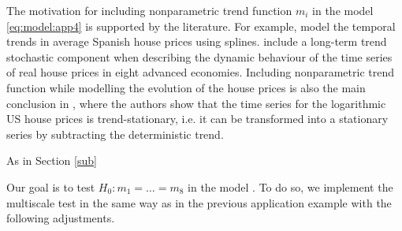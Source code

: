 \documentclass[a4paper,12pt]{article}
\makeatletter
\renewcommand{\eqref}[1]{\tagform@{\ref{#1}}}
\makeatother
\begin{document}
The motivation for including nonparametric trend function $m_i$ in the model \ref{eq:model:app4} is supported by the literature. For example, \cite{Ugarte2009} model the temporal trends in average Spanish house prices using splines. \cite{Winter2022} include a long-term trend stochastic component when describing the dynamic behaviour of the time series of real house prices in eight advanced economies. Including nonparametric trend function while modelling the evolution of the house prices is also the main conclusion in \cite{Zhang2016}, where the authors show that the time series for the logarithmic US house prices is trend-stationary, i.e. it can be transformed into a stationary series by subtracting the deterministic trend.

As in Section \ref{sub}

Our goal is to test $H_0: m_1 = \ldots = m_8$ in the model \eqref{eq:model:app4}. To do so, we implement the multiscale test in the same way as in the previous application example with the following adjustments.
\end{document}
